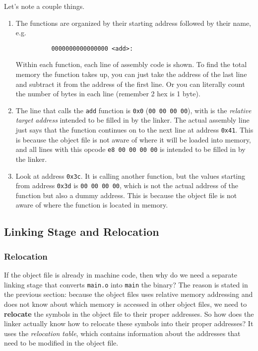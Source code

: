     Let's note a couple things. 
    \begin{enumerate}
      \item The functions are organized by their starting address followed by their name, e.g.  
        \begin{lstlisting}
          0000000000000000 <add>:
        \end{lstlisting}
        Within each function, each line of assembly code is shown. To find the total memory the function takes up, you can just take the address of the last line and subtract it from the address of the first line. Or you can literally count the number of bytes in each line (remember 2 hex is 1 byte). 
      \item The line that calls the \texttt{add} function is \texttt{0x0} (\texttt{00 00 00 00}), with is the \textit{relative target address} intended to be filled in by the linker. The actual assembly line just says that the function continues on to the next line at address \texttt{0x41}. This is because the object file is not aware of where it will be loaded into memory, and all lines with this opcode \texttt{e8 00 00 00 00} is intended to be filled in by the linker. 
      \item Look at address \texttt{0x3c}. It is calling another function, but the values starting from address \texttt{0x3d} is \texttt{00 00 00 00}, which is not the actual address of the function but also a dummy address. This is because the object file is not aware of where the function is located in memory.
    \end{enumerate}

  \subsection{Linking Stage and Relocation}

    \subsubsection{Relocation}

      If the object file is already in machine code, then why do we need a separate linking stage that converts \texttt{main.o} into \texttt{main} the binary? The reason is stated in the previous section: because the object files uses relative memory addressing and does not know about which memory is accessed in other object files, we need to \textbf{relocate} the symbols in the object file to their proper addresses. So how does the linker actually know how to relocate these symbols into their proper addresses? It uses the \textit{relocation table}, which contains information about the addresses that need to be modified in the object file. 

